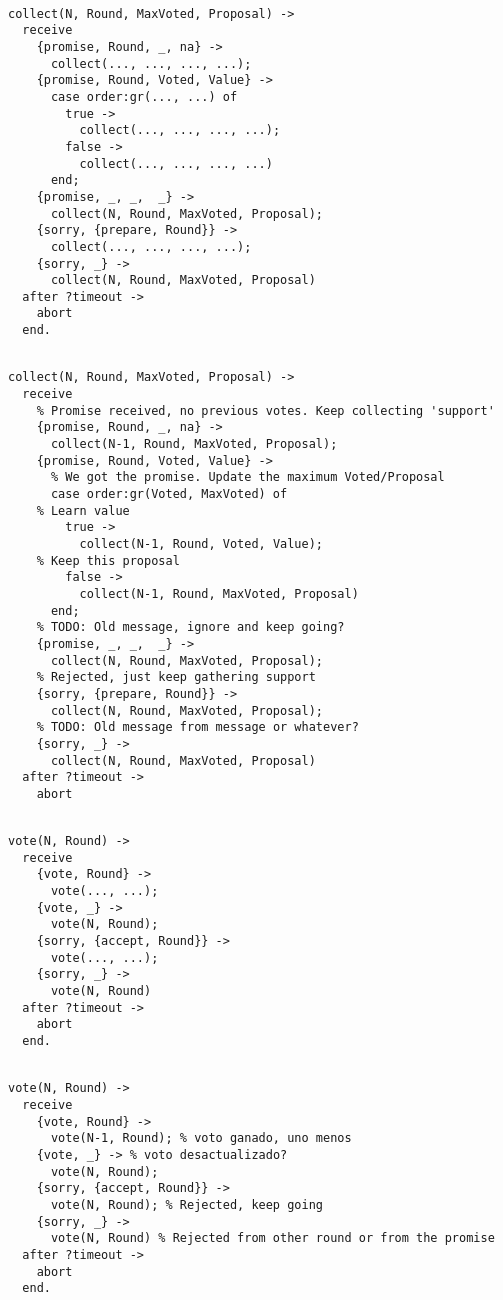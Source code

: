 \documentclass[a4paper, 10pt]{article}
\begin{document}
\begin{lstlisting}
  
collect(N, Round, MaxVoted, Proposal) ->
  receive 
    {promise, Round, _, na} ->
      collect(..., ..., ..., ...);
    {promise, Round, Voted, Value} ->
      case order:gr(..., ...) of
        true ->
          collect(..., ..., ..., ...);
        false ->
          collect(..., ..., ..., ...)
      end;
    {promise, _, _,  _} ->
      collect(N, Round, MaxVoted, Proposal);
    {sorry, {prepare, Round}} ->
      collect(..., ..., ..., ...);
    {sorry, _} ->
      collect(N, Round, MaxVoted, Proposal)
  after ?timeout ->
    abort
  end.
\end{lstlisting}

\begin{lstlisting}

collect(N, Round, MaxVoted, Proposal) ->
  receive 
    % Promise received, no previous votes. Keep collecting 'support'
    {promise, Round, _, na} ->
      collect(N-1, Round, MaxVoted, Proposal);
    {promise, Round, Voted, Value} ->
      % We got the promise. Update the maximum Voted/Proposal
      case order:gr(Voted, MaxVoted) of
	% Learn value
        true ->
          collect(N-1, Round, Voted, Value);
	% Keep this proposal
        false ->
          collect(N-1, Round, MaxVoted, Proposal)
      end;
    % TODO: Old message, ignore and keep going?
    {promise, _, _,  _} ->
      collect(N, Round, MaxVoted, Proposal);
    % Rejected, just keep gathering support
    {sorry, {prepare, Round}} ->
      collect(N, Round, MaxVoted, Proposal);
    % TODO: Old message from message or whatever?
    {sorry, _} ->
      collect(N, Round, MaxVoted, Proposal)
  after ?timeout ->
    abort
\end{lstlisting}


\begin{lstlisting}
  
vote(N, Round) ->
  receive
    {vote, Round} ->
      vote(..., ...);
    {vote, _} ->
      vote(N, Round);
    {sorry, {accept, Round}} ->
      vote(..., ...);
    {sorry, _} ->
      vote(N, Round)
  after ?timeout ->
    abort
  end.
\end{lstlisting}

\begin{lstlisting}

vote(N, Round) ->
  receive
    {vote, Round} ->
      vote(N-1, Round); % voto ganado, uno menos
    {vote, _} -> % voto desactualizado?
      vote(N, Round);
    {sorry, {accept, Round}} ->
      vote(N, Round); % Rejected, keep going
    {sorry, _} ->
      vote(N, Round) % Rejected from other round or from the promise
  after ?timeout ->
    abort
  end.
\end{lstlisting}
\end{document}
